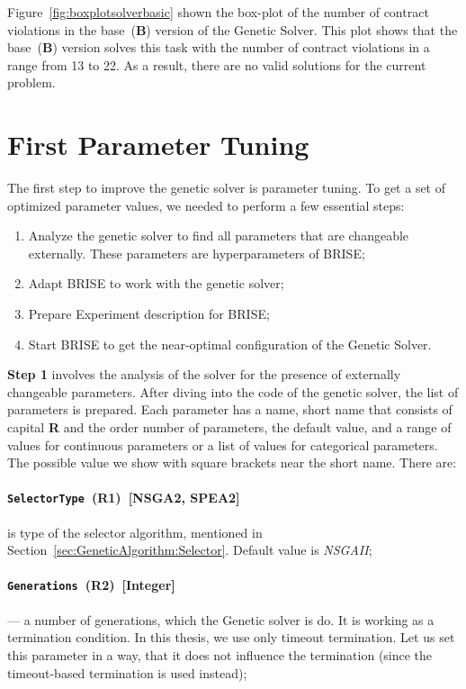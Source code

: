 Figure~\ref{fig:boxplotsolverbasic} shown the box-plot of the number of contract violations in the base~(\textbf{B}) version of the Genetic Solver. This plot shows that  the base~(\textbf{B}) version solves this task with the number of contract violations in a range from 13 to 22. As a result, there are no valid solutions for the current problem.




\section{First Parameter Tuning}

The first step to improve the genetic solver is parameter tuning. To get a set of optimized parameter values, we needed to perform a few essential steps:

\begin{enumerate}
	\item Analyze the genetic solver to find all parameters that are changeable externally. These parameters are hyperparameters of BRISE;
	\item Adapt BRISE to work with the genetic solver;
	\item Prepare Experiment description for BRISE;
	\item Start BRISE to get the near-optimal configuration of the Genetic Solver.
\end{enumerate}

\textbf{Step 1} involves the analysis of the solver for the presence of externally changeable parameters. After diving into the code of the genetic solver, the list of parameters is prepared. Each parameter has a name, short name that consists of capital \textbf{R} and the order number of parameters, the default value, and a range of values for continuous parameters or a list of values for categorical parameters. The possible value we show with square brackets near the short name. There are:
\paragraph{\texttt{SelectorType}~(R1)~[NSGA2, SPEA2]} is type of the selector algorithm, mentioned in Section~\ref{sec:GeneticAlgorithm:Selector}. Default value is \textit{NSGAII};
\paragraph{\texttt{Generations}~(R2)~[Integer]} — a number of generations, which the Genetic solver is do. It is working as a termination condition. In this thesis, we use only timeout termination. Let us set this parameter in a way, that it does not influence the termination (since the timeout-based termination is used instead);
